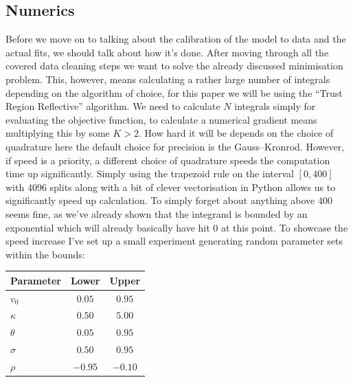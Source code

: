 \subsection{Numerics}
Before we move on to talking about the calibration of the model to data and the actual fits, we should talk about how it's done. After moving through all the covered data cleaning steps
we want to solve the already discussed minimisation problem. This, however, means calculating a rather large number of integrals depending on the algorithm of choice, for this paper we will be using the ``Trust Region Reflective'' algorithm.
We need to calculate $N$ integrals simply
for evaluating the objective function, to calculate a numerical gradient means multiplying this by some $K > 2$. How hard it will be depends on the choice of quadrature  here the default choice for precision is the Gauss--Kronrod.
However, if speed is a priority, a different choice of quadrature speeds the computation time up significantly. Simply using the trapezoid rule on the interval $[0,400]$ with 4096 splits along with a bit of clever vectorisation in Python
allows us to significantly speed up calculation. To simply forget about anything above 400 seems fine, as we've already shown that the integrand is bounded by an exponential which will already basically have hit 0 at this point.
To showcase the speed increase I've set up a small experiment generating random parameter sets within the bounds:

\begin{center}
\begin{tabular}{lcc}
\textbf{Parameter} & \textbf{Lower} & \textbf{Upper} \\
\hline
$v_0$      & $0.05$ & $0.95$ \\
$\kappa$   & $0.50$ & $5.00$ \\
$\theta$   & $0.05$ & $0.95$ \\
$\sigma$      & $0.50$ & $0.95$ \\
$\rho$     & $-0.95$ & $-0.10$ \\
\end{tabular}
\end{center}

